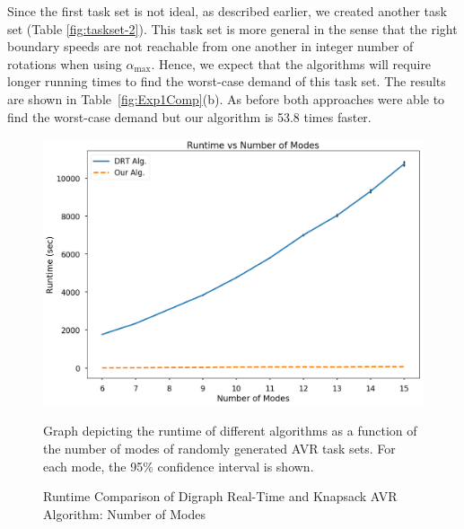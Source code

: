 \begin{table}
\begin{center}
\caption{Runtime Comparison of Digraph Real-Time and Knapsack AVR Algorithm: DBF over 1$s$}
\label{fig:Exp1Comp}

\end{center}
\end{table}
Since the first task set is not ideal, as described earlier, we created another task set (Table \ref{fig:taskset-2}). This task set is more general in the sense that the right boundary speeds are not reachable from one another in integer number of rotations when using $\alpha_{\max}$. Hence, we expect that the algorithms will require longer running times to find the worst-case demand of this task set.
The results are shown in Table~\ref{fig:Exp1Comp}(b). As before both approaches were able to find the worst-case demand but our algorithm is 53.8 times faster.

\begin{figure}
\centering
\includegraphics[width=1.0\linewidth]{fig/runtimePlot-confidence_intervals.png}
\caption{Runtime Comparison of Digraph Real-Time and Knapsack AVR Algorithm: Number of Modes}Graph depicting the runtime of different algorithms as a function of the number of modes of randomly generated AVR task sets. For each mode, the 95\% confidence interval is shown.
\label{fig:finalgraph}
\end{figure}

